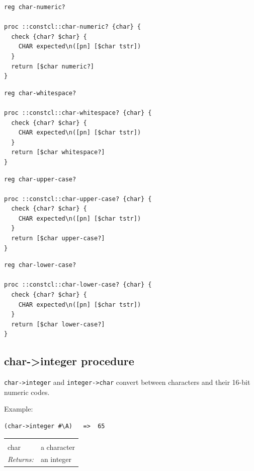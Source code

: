 \documentclass[a5paper,draft]{memoir}
\begin{document}
\begin{lstlisting}
reg char-numeric?

proc ::constcl::char-numeric? {char} {
  check {char? $char} {
    CHAR expected\n([pn] [$char tstr])
  }
  return [$char numeric?]
}
\end{lstlisting}

\begin{lstlisting}
reg char-whitespace?

proc ::constcl::char-whitespace? {char} {
  check {char? $char} {
    CHAR expected\n([pn] [$char tstr])
  }
  return [$char whitespace?]
}
\end{lstlisting}

\begin{lstlisting}
reg char-upper-case?

proc ::constcl::char-upper-case? {char} {
  check {char? $char} {
    CHAR expected\n([pn] [$char tstr])
  }
  return [$char upper-case?]
}
\end{lstlisting}

\begin{lstlisting}
reg char-lower-case?

proc ::constcl::char-lower-case? {char} {
  check {char? $char} {
    CHAR expected\n([pn] [$char tstr])
  }
  return [$char lower-case?]
}
\end{lstlisting}

\subsection{char->integer procedure}
\label{charinteger-procedure}

\texttt{char->integer} and \texttt{integer->char} convert between characters and their 16-bit numeric codes.

Example:

\begin{verbatim}
(char->integer #\A)   =>  65
\end{verbatim}

\noindent\begin{tabular}{ |p{1.9cm} p{6.5cm}| }
\hline
\rowcolor[HTML]{CCCCCC} \multicolumn{2}{|l|}{\textbf{char->integer (public)}} \\
char & a character \\
\textit{Returns:} & an integer \\
\hline
\end{tabular}
\end{document}
